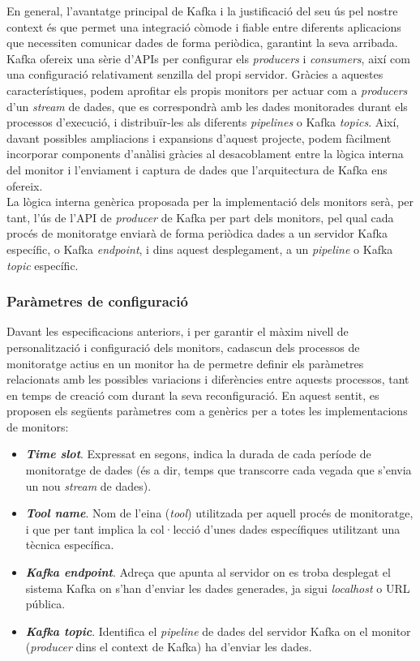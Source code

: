 En general, l'avantatge principal de Kafka i la justificació del seu ús pel nostre context és que permet una integració còmode i fiable entre diferents aplicacions que necessiten comunicar dades de forma periòdica, garantint la seva arribada. Kafka ofereix una sèrie d'APIs per configurar els \textit{producers} i \textit{consumers}, així com una configuració relativament senzilla del propi servidor. Gràcies a aquestes característiques, podem aprofitar els propis monitors per actuar com a \textit{producers} d'un \textit{stream} de dades, que es correspondrà amb les dades monitorades durant els processos d'execució, i distribuïr-les als diferents \textit{pipelines} o Kafka \textit{topics}. Així, davant possibles ampliacions i expansions d'aquest projecte, podem fàcilment incorporar components d'anàlisi gràcies al desacoblament entre la lògica interna del monitor i l'enviament i captura de dades que l'arquitectura de Kafka ens ofereix.\\

La lògica interna genèrica proposada per la implementació dels monitors serà, per tant, l'ús de l'API de \textit{producer} de Kafka per part dels monitors, pel qual cada procés de monitoratge enviarà de forma periòdica dades a un servidor Kafka específic, o Kafka \textit{endpoint}, i dins aquest desplegament, a un \textit{pipeline} o Kafka \textit{topic} específic.

\subsubsection{Paràmetres de configuració}

Davant les especificacions anteriors, i per garantir el màxim nivell de personalització i configuració dels monitors, cadascun dels processos de monitoratge actius en un monitor ha de permetre definir els paràmetres relacionats amb les possibles variacions i diferències entre aquests processos, tant en temps de creació com durant la seva reconfiguració. En aquest sentit, es proposen els següents paràmetres com a genèrics per a totes les implementacions de monitors:

\begin{itemize}
\item \textbf{\textit{Time slot}}. Expressat en segons, indica la durada de cada període de monitoratge de dades (és a dir, temps que transcorre cada vegada que s'envia un nou \textit{stream} de dades).
\item \textbf{\textit{Tool name}}. Nom de l'eina (\textit{tool}) utilitzada per aquell procés de monitoratge, i que per tant implica la col·lecció d'unes dades específiques utilitzant una tècnica específica.
\item \textbf{\textit{Kafka endpoint}}. Adreça que apunta al servidor on es troba desplegat el sistema Kafka on s'han d'enviar les dades generades, ja sigui \textit{localhost} o URL pública.
\item \textbf{\textit{Kafka topic}}. Identifica el \textit{pipeline} de dades del servidor Kafka on el monitor (\textit{producer} dins el context de Kafka) ha d'enviar les dades.
\end{itemize}


